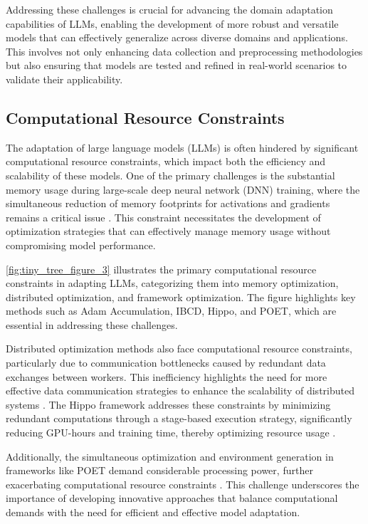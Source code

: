 Addressing these challenges is crucial for advancing the domain adaptation capabilities of LLMs, enabling the development of more robust and versatile models that can effectively generalize across diverse domains and applications. This involves not only enhancing data collection and preprocessing methodologies but also ensuring that models are tested and refined in real-world scenarios to validate their applicability.




\subsection{Computational Resource Constraints} \label{subsec:Computational Resource Constraints}

The adaptation of large language models (LLMs) is often hindered by significant computational resource constraints, which impact both the efficiency and scalability of these models. One of the primary challenges is the substantial memory usage during large-scale deep neural network (DNN) training, where the simultaneous reduction of memory footprints for activations and gradients remains a critical issue \cite{zhang2023adamaccumulationreducememory}. This constraint necessitates the development of optimization strategies that can effectively manage memory usage without compromising model performance.

\autoref{fig:tiny_tree_figure_3} illustrates the primary computational resource constraints in adapting LLMs, categorizing them into memory optimization, distributed optimization, and framework optimization. The figure highlights key methods such as Adam Accumulation, IBCD, Hippo, and POET, which are essential in addressing these challenges. 

Distributed optimization methods also face computational resource constraints, particularly due to communication bottlenecks caused by redundant data exchanges between workers. This inefficiency highlights the need for more effective data communication strategies to enhance the scalability of distributed systems \cite{mishchenko201999distributedoptimizationwaste}. The Hippo framework addresses these constraints by minimizing redundant computations through a stage-based execution strategy, significantly reducing GPU-hours and training time, thereby optimizing resource usage \cite{shin2020hippotaminghyperparameteroptimization}.

Additionally, the simultaneous optimization and environment generation in frameworks like POET demand considerable processing power, further exacerbating computational resource constraints \cite{wang2019pairedopenendedtrailblazerpoet}. This challenge underscores the importance of developing innovative approaches that balance computational demands with the need for efficient and effective model adaptation.

